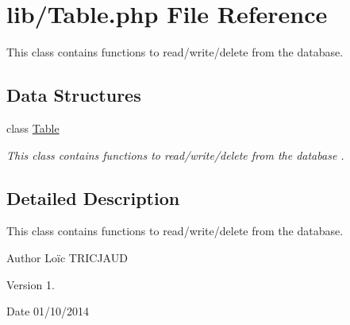 \hypertarget{_table_8php}{\section{lib/\-Table.php File Reference}
\label{_table_8php}
}


This class contains functions to read/write/delete from the database.  


\subsection*{Data Structures}
\begin{DoxyCompactItemize}
\item 
class \hyperlink{class_table}{Table}
\begin{DoxyCompactList}\small\item\em This class contains functions to read/write/delete from the database . \end{DoxyCompactList}\end{DoxyCompactItemize}


\subsection{Detailed Description}
This class contains functions to read/write/delete from the database. \begin{DoxyAuthor}{Author}
Loïc T\-R\-I\-C\-J\-A\-U\-D 
\end{DoxyAuthor}
\begin{DoxyVersion}{Version}
1. 
\end{DoxyVersion}
\begin{DoxyDate}{Date}
01/10/2014 
\end{DoxyDate}
